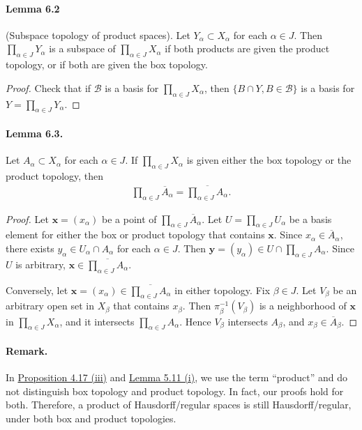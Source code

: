 \documentclass{article}
\numberwithin{equation}{section}
\theoremstyle{plain}
\theoremstyle{definition}
\begin{document}
\paragraph{Lemma 6.2\label{lemma:6.2}} (Subspace topology of product spaces). Let $Y_\alpha\subset X_\alpha$ for each $\alpha\in J$. Then $\prod_{\alpha\in J}Y_\alpha$ is a subspace of $\prod_{\alpha\in J}X_\alpha$ if both products are given the product topology, or if both are given the box topology.
\begin{proof}
Check that if $\mathscr{B}$ is a basis for $\prod_{\alpha\in J}X_\alpha$, then $\{B\cap Y,B\in\mathscr{B}\}$ is a basis for $Y=\prod_{\alpha\in J}Y_\alpha$.
\end{proof}

\paragraph{Lemma 6.3.\label{lemma:6.3}} Let $A_\alpha\subset X_\alpha$ for each $\alpha\in J$. If $\prod_{\alpha\in J} X_\alpha$ is given either the box topology or the product topology, then
\begin{align*}
	\prod_{\alpha\in J}\overline{A}_\alpha = \overline{\prod_{\alpha\in J}A_\alpha}.
\end{align*}
\begin{proof}
Let $\mathbf{x}=(x_\alpha)$ be a point of $\prod_{\alpha\in J}\overline{A}_\alpha$. Let $U=\prod_{\alpha\in J}U_\alpha$ be a basis element for either the box or product topology that contains $\mathbf{x}$. Since $x_\alpha\in\overline{A}_\alpha$, there exists $y_\alpha\in U_\alpha\cap A_\alpha$ for each $\alpha\in J$. Then $\mathbf{y}=(y_\alpha)\in U\cap\prod_{\alpha\in J}A_\alpha$. Since $U$ is arbitrary, $\mathbf{x}\in\overline{\prod_{\alpha\in J}A_\alpha}$.

Conversely, let $\mathbf{x}=(x_\alpha)\in\overline{\prod_{\alpha\in J}A_\alpha}$ in either topology. Fix $\beta\in J$. Let $V_\beta$ be an arbitrary open set in $X_\beta$ that contains $x_\beta$. Then $\pi_\beta^{-1}(V_\beta)$ is a neighborhood of $\mathbf{x}$ in $\prod_{\alpha\in J}X_\alpha$, and it intersects $\prod_{\alpha\in J}A_\alpha$. Hence $V_\beta$ intersects $A_\beta$, and $x_\beta\in\overline{A}_\beta$.
\end{proof}

\paragraph{Remark.} In \hyperref[prop:4.17]{Proposition 4.17 (iii)} and \hyperref[lemma:5.11]{Lemma 5.11 (i)}, we use the term ``product'' and do not distinguish box topology and product topology. In fact, our proofs hold for both. Therefore, a product of Hausdorff/regular spaces is still Hausdorff/regular, under both box and product topologies.
\end{document}
